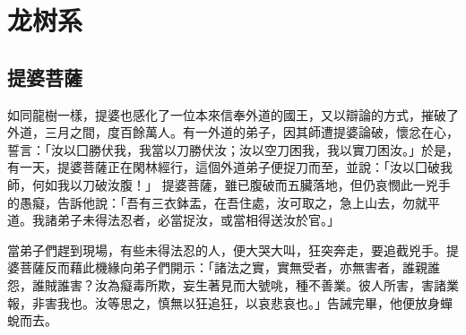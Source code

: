\section{龙树系}

\subsection{提婆菩薩}
如同龍樹一樣，提婆也感化了一位本來信奉外道的國王，又以辯論的方式，摧破了外道，三月之間，度百餘萬人。有一外道的弟子，因其師遭提婆論破，懷忿在心，誓言：「汝以囗勝伏我，我當以刀勝伏汝；汝以空刀困我，我以實刀困汝。」於是，有一天，提婆菩薩正在閑林經行，這個外道弟子便捉刀而至，並說：「汝以囗破我師，何如我以刀破汝腹！」
提婆菩薩，雖已腹破而五臟落地，但仍哀憫此一兇手的愚癡，告訴他說：「吾有三衣鉢盂，在吾住處，汝可取之，急上山去，勿就平道。我諸弟子未得法忍者，必當捉汝，或當相得送汝於官。」

當弟子們趕到現場，有些未得法忍的人，便大哭大叫，狂突奔走，要追截兇手。提婆菩薩反而藉此機緣向弟子們開示：「諸法之實，實無受者，亦無害者，誰親誰怨，誰賊誰害？汝為癡毒所欺，妄生著見而大號咷，種不善業。彼人所害，害諸業報，非害我也。汝等思之，慎無以狂追狂，以哀悲哀也。」告誡完畢，他便放身蟬蛻而去。
